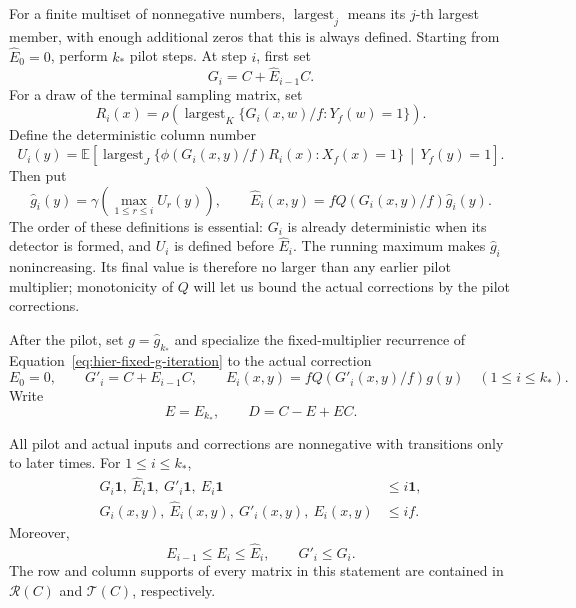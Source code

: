For a finite multiset of nonnegative numbers, $\operatorname{largest}_j$
means its $j$-th largest member, with enough additional zeros that this is
always defined.  Starting from $\widehat E_0=0$, perform $k_*$ pilot
steps.  At step $i$, first set
\begin{equation}
 G_i=C+\widehat E_{i-1}C.
 \label{eq:hier-pilot-input}
\end{equation}
For a draw of the terminal sampling matrix, set
\begin{equation}
 R_i(x)=\rho\left(\operatorname{largest}_K
       \{G_i(x,w)/f:Y_f(w)=1\}\right).
 \label{eq:hier-pilot-row-gate}
\end{equation}
Define the deterministic column number
\begin{equation}
 U_i(y)=\mathbb E\left[
    \operatorname{largest}_J
       \{\phi(G_i(x,y)/f)R_i(x):X_f(x)=1\}
       \,\middle|\,Y_f(y)=1\right].
 \label{eq:hier-detector}
\end{equation}
Then put
\begin{equation}
 \widehat g_i(y)=\gamma\left(\max_{1\leq r\leq i}U_r(y)\right),
 \qquad
 \widehat E_i(x,y)=fQ(G_i(x,y)/f)\widehat g_i(y).
 \label{eq:hier-pilot-correction}
\end{equation}
The order of these definitions is essential: $G_i$ is already
deterministic when its detector is formed, and $U_i$ is defined before
$\widehat E_i$.  The running maximum makes $\widehat g_i$ nonincreasing.
Its final value is therefore no larger than any earlier pilot multiplier;
monotonicity of $Q$ will let us bound the actual corrections by the pilot
corrections.

After the pilot, set $g=\widehat g_{k_*}$ and specialize the fixed-multiplier
recurrence of Equation~\eqref{eq:hier-fixed-g-iteration} to the actual correction
\begin{equation}
 E_0=0,\qquad G'_i=C+E_{i-1}C,\qquad
 E_i(x,y)=fQ(G'_i(x,y)/f)g(y)\quad(1\leq i\leq k_*).
 \label{eq:hier-actual-iteration}
\end{equation}
Write
\begin{equation}
 E=E_{k_*},\qquad D=C-E+EC.
 \label{eq:hier-residual-definition}
\end{equation}

\begin{lemma}
\label{lem:hier-pilot-bounds}
All pilot and actual inputs and corrections are nonnegative with transitions only to later times.  For $1\leq i\leq k_*$,
\begin{align*}
 G_i\mathbf 1,\ \widehat E_i\mathbf 1,
     \ G'_i\mathbf 1,\ E_i\mathbf 1&\leq i\mathbf 1,\\
 G_i(x,y),\ \widehat E_i(x,y),
     \ G'_i(x,y),\ E_i(x,y)&\leq if.
\end{align*}
Moreover,
\[
 E_{i-1}\leq E_i\leq\widehat E_i,
 \qquad G'_i\leq G_i.
\]
The row and column supports of every matrix in this statement are
contained in $\mathcal R(C)$ and $\mathcal T(C)$, respectively.
\end{lemma}


